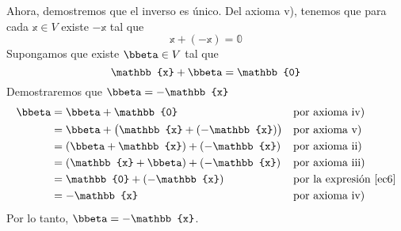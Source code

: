 \begin{theorem}
    
    Ahora, demostremos que el inverso es único. Del axioma v), tenemos que para cada $\mathbb{x} \in V$ existe $-\mathbb{x}$ tal que
    \begin{equation}
        \mathbb{x} + (-\mathbb{x}) = \mathbb{0} \label{ec5}
    \end{equation}
    Supongamos que existe $\bbeta \in V$ tal que
    \begin{equation}
        \mathbb{x} + \bbeta = \mathbb{0} \label{ec6}
    \end{equation}
    Demostraremos que $\bbeta = -\mathbb{x}$
    \begin{align*}
        \bbeta & = \bbeta + \mathbb{0} && \text{por axioma iv)} \\
        & = \bbeta + \big( \mathbb{x} + (-\mathbb{x}) \big) && \text{por axioma v)} \\
        & = (\bbeta + \mathbb{x}) + (-\mathbb{x}) && \text{por axioma ii)} \\
        & = (\mathbb{x} + \bbeta) + (-\mathbb{x}) && \text{por axioma iii)} \\
        & = \mathbb{0} + (-\mathbb{x}) && \text{por la expresión \eqref{ec6}} \\
        & = -\mathbb{x} && \text{por axioma iv)}
    \end{align*}
    Por lo tanto, $\bbeta = -\mathbb{x}$.
\end{theorem}

